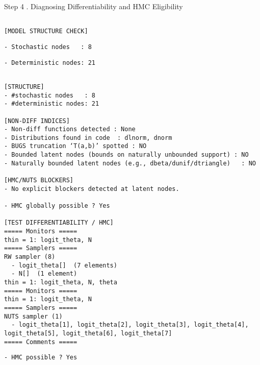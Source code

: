 \documentclass[
  10pt,
  ignorenonframetext,
  aspectratio=169]{beamer}
\begin{document}
\begin{frame}[fragile]{Step 4 . Diagnosing Differentiability and HMC
Eligibility}
\label{step-4-.-diagnosing-differentiability-and-hmc-eligibility}
\begin{lstlisting}

[MODEL STRUCTURE CHECK]
\end{lstlisting}

\begin{lstlisting}
- Stochastic nodes   : 8
\end{lstlisting}

\begin{lstlisting}
- Deterministic nodes: 21
\end{lstlisting}

\begin{lstlisting}

[STRUCTURE]
- #stochastic nodes   : 8
- #deterministic nodes: 21

[NON-DIFF INDICES]
- Non-diff functions detected : None
- Distributions found in code  : dlnorm, dnorm
- BUGS truncation ‘T(a,b)’ spotted : NO
- Bounded latent nodes (bounds on naturally unbounded support) : NO
- Naturally bounded latent nodes (e.g., dbeta/dunif/dtriangle)   : NO

[HMC/NUTS BLOCKERS]
- No explicit blockers detected at latent nodes.

- HMC globally possible ? Yes

[TEST DIFFERENTIABILITY / HMC]
===== Monitors =====
thin = 1: logit_theta, N
===== Samplers =====
RW sampler (8)
  - logit_theta[]  (7 elements)
  - N[]  (1 element)
thin = 1: logit_theta, N, theta
===== Monitors =====
thin = 1: logit_theta, N
===== Samplers =====
NUTS sampler (1)
  - logit_theta[1], logit_theta[2], logit_theta[3], logit_theta[4], logit_theta[5], logit_theta[6], logit_theta[7] 
===== Comments =====
\end{lstlisting}

\begin{lstlisting}
- HMC possible ? Yes
\end{lstlisting}
\end{frame}
\end{document}
